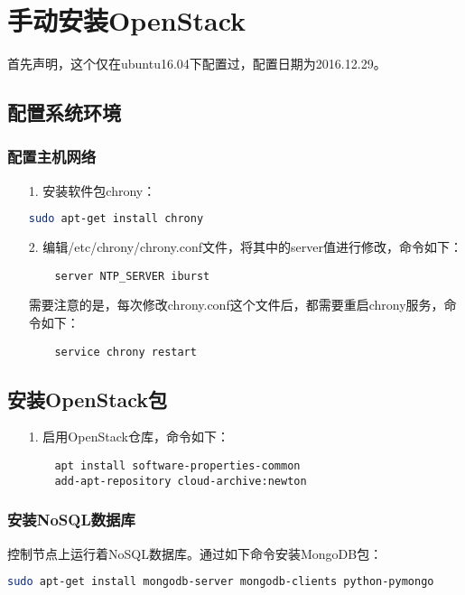 \documentclass[a4paper,left=2.5cm,right=2.5cm,11pt]{article}
\begin{document}

\clearpage

\section{手动安装OpenStack}
	首先声明，这个仅在ubuntu16.04下配置过，配置日期为2016.12.29。\par

\subsection{配置系统环境}
\subsubsection{配置主机网络}
	\begin{itemize}
		\item[1.] 安装软件包chrony：
		\begin{lstlisting}[language = bash]
	sudo apt-get install chrony
		\end{lstlisting}

		\item[2.] 编辑/etc/chrony/chrony.conf文件，将其中的server值进行修改，命令如下：
		\begin{lstlisting}
	server NTP_SERVER iburst
		\end{lstlisting}

		需要注意的是，每次修改chrony.conf这个文件后，都需要重启chrony服务，命令如下：
		\begin{lstlisting}
	service chrony restart
		\end{lstlisting}
	\end{itemize}

\subsection{安装OpenStack包}
	\begin{itemize}
		\item[1.] 启用OpenStack仓库，命令如下：
		\begin{lstlisting}
	apt install software-properties-common
	add-apt-repository cloud-archive:newton
		\end{lstlisting}
	\end{itemize}

\subsubsection{安装NoSQL数据库}
	控制节点上运行着NoSQL数据库。通过如下命令安装MongoDB包：
	\begin{lstlisting}[language = bash]
	sudo apt-get install mongodb-server mongodb-clients python-pymongo
	\end{lstlisting}
\end{document}
